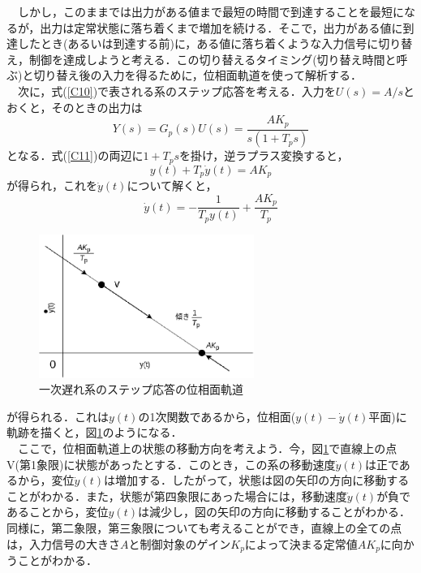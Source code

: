 \documentclass[12pt]{jsarticle}
\begin{document}
　しかし，このままでは出力がある値まで最短の時間で到達することを最短になるが，出力は定常状態に落ち着くまで増加を続ける．そこで，出力がある値に到達したとき(あるいは到達する前)に，ある値に落ち着くような入力信号に切り替え，制御を達成しようと考える．この切り替えるタイミング(切り替え時間と呼ぶ)と切り替え後の入力を得るために，位相面軌道を使って解析する．\\
　次に，式(\ref{C10})で表される系のステップ応答を考える．入力を$U(s)=A/s$とおくと，そのときの出力は
\begin{equation}
\label{C11}
Y(s) = G_p(s)U(s) = \frac{AK_p}{s(1+T_ps)}
\end{equation}
となる．式(\ref{C11})の両辺に$1+T_ps$を掛け，逆ラプラス変換すると，
\begin{equation}
\label{C12}
y(t) + T_p\dot{y}(t) = AK_p
\end{equation}
が得られ，これを$\dot{y}(t)$について解くと，
\begin{equation}
\label{C13}
\dot{y}(t) = -\frac{1}{T_py(t)} + \frac{AK_p}{T_p}
\end{equation}
\begin{figure}[tb]
  \begin{center}
    \includegraphics[clip,width=7.0cm]{../Img/FigC5.eps}
    \caption{一次遅れ系のステップ応答の位相面軌道}
    \label{FigC5}
  \end{center}
\end{figure}
が得られる．これは$y(t)$の1次関数であるから，位相面($y(t)-\dot{y}(t)$平面)に軌跡を描くと，図\ref{FigC5}のようになる．\\
　ここで，位相面軌道上の状態の移動方向を考えよう．今，図\ref{FigC5}で直線上の点V(第1象限)に状態があったとする．このとき，この系の移動速度$\dot{y}(t)$は正であるから，変位$\dot{y}(t)$は増加する．したがって，状態は図の矢印の方向に移動することがわかる．また，状態が第四象限にあった場合には，移動速度$\dot{y}(t)$が負であることから，変位$y(t)$は減少し，図の矢印の方向に移動することがわかる．同様に，第二象限，第三象限についても考えることができ，直線上の全ての点は，入力信号の大きさ$A$と制御対象のゲイン$K_p$によって決まる定常値$AK_p$に向かうことがわかる．\\
\end{document}
